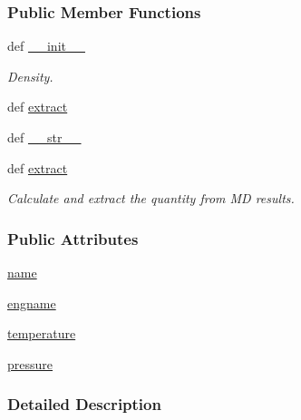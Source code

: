 \subsubsection*{Public Member Functions}
\begin{DoxyCompactItemize}
\item 
def \hyperlink{classforcebalance_1_1quantity_1_1Quantity__Density_a9449ed42ffe0e6c54453d958eb5a1eeb}{\-\_\-\-\_\-init\-\_\-\-\_\-}
\begin{DoxyCompactList}\small\item\em Density. \end{DoxyCompactList}\item 
def \hyperlink{classforcebalance_1_1quantity_1_1Quantity__Density_a08995dfedd7e3504e030d19db949408d}{extract}
\item 
def \hyperlink{classforcebalance_1_1quantity_1_1Quantity_a0b789c405027c2b184f268702d751ff5}{\-\_\-\-\_\-str\-\_\-\-\_\-}
\item 
def \hyperlink{classforcebalance_1_1quantity_1_1Quantity_af237c272a8ec761b4f9b64980eded918}{extract}
\begin{DoxyCompactList}\small\item\em Calculate and extract the quantity from M\-D results. \end{DoxyCompactList}\end{DoxyCompactItemize}
\subsubsection*{Public Attributes}
\begin{DoxyCompactItemize}
\item 
\hyperlink{classforcebalance_1_1quantity_1_1Quantity__Density_afa773ce3a5a4034f6758898cc7d8c900}{name}
\item 
\hyperlink{classforcebalance_1_1quantity_1_1Quantity__Density_a58abd1a788e40a6fd8ca8bbee902b32b}{engname}
\item 
\hyperlink{classforcebalance_1_1quantity_1_1Quantity_a30da0699f09b247b74014a9a1a6a2d09}{temperature}
\item 
\hyperlink{classforcebalance_1_1quantity_1_1Quantity_a972fbe22434f2aedca70addaed1a0bea}{pressure}
\end{DoxyCompactItemize}


\subsubsection{Detailed Description}


